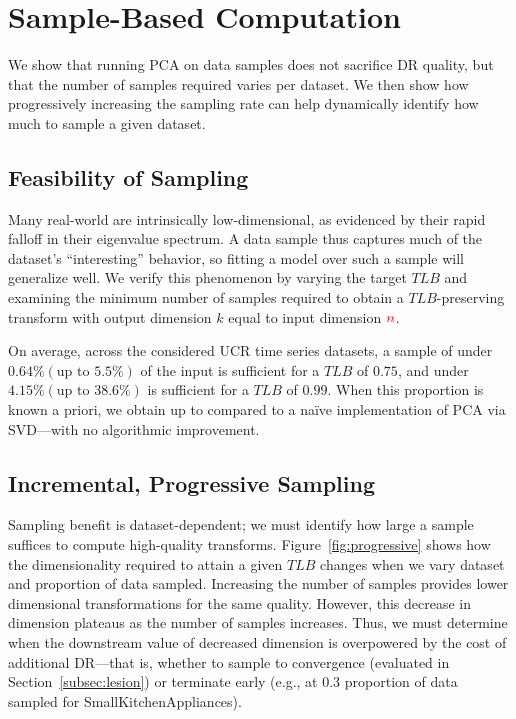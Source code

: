 \section{Sample-Based Computation}
\label{sec:sampling}

We  show that running PCA on data samples does not sacrifice DR quality, but that the number of samples required varies per dataset.
We then show how progressively increasing the sampling rate can help dynamically identify how much to sample a given dataset.

\subsection{Feasibility of Sampling}
Many real-world  are intrinsically low-dimensional, as evidenced by their rapid falloff in their eigenvalue spectrum.
A data sample thus captures much of the dataset's ``interesting'' behavior, so fitting a model over such a sample will generalize well. We verify this phenomenon by varying the target $TLB$ and examining the minimum number of samples required to obtain a $TLB$-preserving transform with output dimension $k$ equal to input dimension ${\color{red}n}$.

On average, across the considered UCR time series datasets, a sample of under $0.64\% (\text{up to } 5.5\%)$ of the input is sufficient for a $TLB$ of $0.75$, and under $4.15\% (\text{up to } 38.6\%)$ is sufficient for a $TLB$ of $0.99$.  
When this proportion is known a priori, we obtain up to  compared to a na\"ive implementation of PCA via SVD---with no algorithmic improvement. 


\subsection{Incremental, Progressive Sampling}
Sampling benefit is dataset-dependent; we must identify how large a sample suffices to compute high-quality transforms.
Figure~\ref{fig:progressive} shows how the dimensionality required to attain a given $TLB$ changes when we vary dataset and proportion of data sampled.
Increasing the number of samples provides lower dimensional transformations for the same quality.
However, this decrease in dimension plateaus as the number of samples increases.
Thus, we must determine when the downstream value of decreased dimension is overpowered by the cost of additional DR---that is, whether to sample to convergence (evaluated in Section~\ref{subsec:lesion}) or terminate early (e.g., at $0.3$ proportion of data sampled for SmallKitchenAppliances). 


